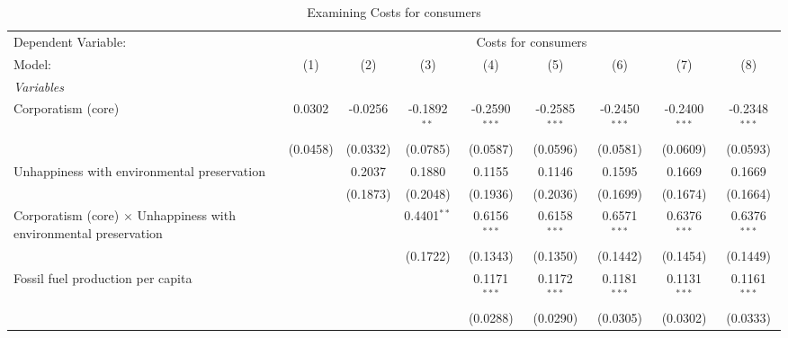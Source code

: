 
\begin{table}[htbp]
   \caption{Examining Costs for consumers}
   \centering
   \begin{tabular}{lcccccccc}
      \tabularnewline \midrule \midrule
      Dependent Variable: & \multicolumn{8}{c}{Costs for consumers}\\
      Model:                                                                   & (1)      & (2)      & (3)            & (4)             & (5)             & (6)             & (7)                    & (8)\\  
      \midrule
      \emph{Variables}\\
      Corporatism (core)                                                       & 0.0302   & -0.0256  & -0.1892$^{**}$ & -0.2590$^{***}$ & -0.2585$^{***}$ & -0.2450$^{***}$ & -0.2400$^{***}$        & -0.2348$^{***}$\\   
                                                                               & (0.0458) & (0.0332) & (0.0785)       & (0.0587)        & (0.0596)        & (0.0581)        & (0.0609)               & (0.0593)\\   
      Unhappiness with environmental preservation                              &          & 0.2037   & 0.1880         & 0.1155          & 0.1146          & 0.1595          & 0.1669                 & 0.1669\\   
                                                                               &          & (0.1873) & (0.2048)       & (0.1936)        & (0.2036)        & (0.1699)        & (0.1674)               & (0.1664)\\   
      Corporatism (core) $\times$ Unhappiness with environmental preservation  &          &          & 0.4401$^{**}$  & 0.6156$^{***}$  & 0.6158$^{***}$  & 0.6571$^{***}$  & 0.6376$^{***}$         & 0.6376$^{***}$\\   
                                                                               &          &          & (0.1722)       & (0.1343)        & (0.1350)        & (0.1442)        & (0.1454)               & (0.1449)\\   
      Fossil fuel production per capita                                        &          &          &                & 0.1171$^{***}$  & 0.1172$^{***}$  & 0.1181$^{***}$  & 0.1131$^{***}$         & 0.1161$^{***}$\\   
                                                                               &          &          &                & (0.0288)        & (0.0290)        & (0.0305)        & (0.0302)               & (0.0333)\\   

\end{tabular}
\end{table}
